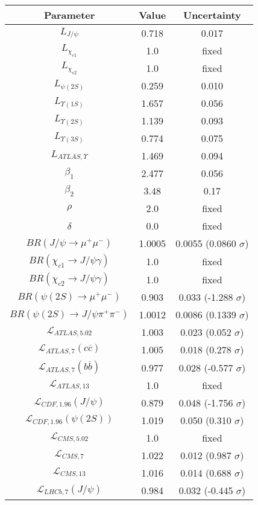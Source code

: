 \begin{table}[h!]
\centering
\begin{tabular}{c|c|c}
Parameter & Value & Uncertainty \\
\hline
$L_{J/\psi}$ & 0.718 & 0.017 \\
$L_{\chi_{c1}}$ & 1.0 & fixed \\
$L_{\chi_{c2}}$ & 1.0 & fixed \\
$L_{\psi(2S)}$ & 0.259 & 0.010 \\
$L_{\Upsilon(1S)}$ & 1.657 & 0.056 \\
$L_{\Upsilon(2S)}$ & 1.139 & 0.093 \\
$L_{\Upsilon(3S)}$ & 0.774 & 0.075 \\
$L_{ATLAS,\Upsilon}$ & 1.469 & 0.094 \\
$\beta_1$ & 2.477 & 0.056 \\
$\beta_2$ & 3.48 & 0.17 \\
$\rho$ & 2.0 & fixed \\
$\delta$ & 0.0 & fixed \\
$BR(J/\psi\rightarrow\mu^+\mu^-)$ & 1.0005 & 0.0055 (0.0860 $\sigma$) \\
$BR(\chi_{c1}\rightarrow J/\psi\gamma)$ & 1.0 & fixed \\
$BR(\chi_{c2}\rightarrow J/\psi\gamma)$ & 1.0 & fixed \\
$BR(\psi(2S)\rightarrow\mu^+\mu^-)$ & 0.903 & 0.033 (-1.288 $\sigma$) \\
$BR(\psi(2S)\rightarrow J/\psi\pi^+\pi^-)$ & 1.0012 & 0.0086 (0.1339 $\sigma$) \\
$\mathcal L_{ATLAS,5.02}$ & 1.003 & 0.023 (0.052 $\sigma$) \\
$\mathcal L_{ATLAS,7}(c\overline c)$ & 1.005 & 0.018 (0.278 $\sigma$) \\
$\mathcal L_{ATLAS,7}(b\overline b)$ & 0.977 & 0.028 (-0.577 $\sigma$) \\
$\mathcal L_{ATLAS,13}$ & 1.0 & fixed \\
$\mathcal L_{CDF,1.96}(J/\psi)$ & 0.879 & 0.048 (-1.756 $\sigma$) \\
$\mathcal L_{CDF,1.96}(\psi(2S))$ & 1.019 & 0.050 (0.310 $\sigma$) \\
$\mathcal L_{CMS,5.02}$ & 1.0 & fixed \\
$\mathcal L_{CMS,7}$ & 1.022 & 0.012 (0.987 $\sigma$) \\
$\mathcal L_{CMS,13}$ & 1.016 & 0.014 (0.688 $\sigma$) \\
$\mathcal L_{LHCb,7}(J/\psi)$ & 0.984 & 0.032 (-0.445 $\sigma$) \\

\end{tabular}
\end{table}
